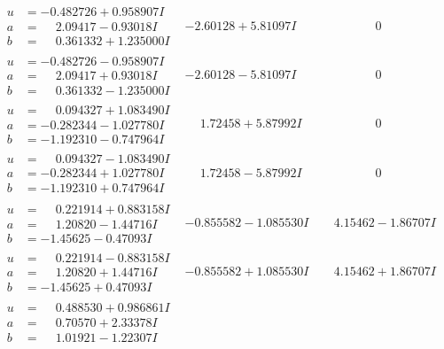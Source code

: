 \documentclass[1p]{elsarticle_modified}
\theoremstyle{definition}
\begin{document}
$$\begin{array}{c|c|c}
\begin{aligned}
u &= -0.482726 + 0.958907 I \\
a &= \phantom{-}2.09417 - 0.93018 I \\
b &= \phantom{-}0.361332 + 1.235000 I\end{aligned}
 & -2.60128 + 5.81097 I & \phantom{-0.000000 } 0 \\ \hline\begin{aligned}
u &= -0.482726 - 0.958907 I \\
a &= \phantom{-}2.09417 + 0.93018 I \\
b &= \phantom{-}0.361332 - 1.235000 I\end{aligned}
 & -2.60128 - 5.81097 I & \phantom{-0.000000 } 0 \\ \hline\begin{aligned}
u &= \phantom{-}0.094327 + 1.083490 I \\
a &= -0.282344 - 1.027780 I \\
b &= -1.192310 - 0.747964 I\end{aligned}
 & \phantom{-}1.72458 + 5.87992 I & \phantom{-0.000000 } 0 \\ \hline\begin{aligned}
u &= \phantom{-}0.094327 - 1.083490 I \\
a &= -0.282344 + 1.027780 I \\
b &= -1.192310 + 0.747964 I\end{aligned}
 & \phantom{-}1.72458 - 5.87992 I & \phantom{-0.000000 } 0 \\ \hline\begin{aligned}
u &= \phantom{-}0.221914 + 0.883158 I \\
a &= \phantom{-}1.20820 - 1.44716 I \\
b &= -1.45625 - 0.47093 I\end{aligned}
 & -0.855582 - 1.085530 I & \phantom{-}4.15462 - 1.86707 I \\ \hline\begin{aligned}
u &= \phantom{-}0.221914 - 0.883158 I \\
a &= \phantom{-}1.20820 + 1.44716 I \\
b &= -1.45625 + 0.47093 I\end{aligned}
 & -0.855582 + 1.085530 I & \phantom{-}4.15462 + 1.86707 I \\ \hline\begin{aligned}
u &= \phantom{-}0.488530 + 0.986861 I \\
a &= \phantom{-}0.70570 + 2.33378 I \\
b &= \phantom{-}1.01921 - 1.22307 I\end{aligned}

\end{array}$$
\end{document}

